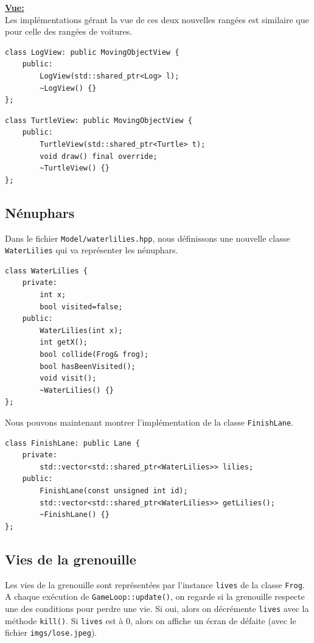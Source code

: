 \documentclass[a4paper, 12pt]{article}
\begin{document}
\underline{\textbf{Vue:}} \\
Les implémentations gérant la vue de ces deux nouvelles rangées est similaire que pour celle 
des rangées de voitures.
\begin{lstlisting}
class LogView: public MovingObjectView {
    public:
        LogView(std::shared_ptr<Log> l);
        ~LogView() {}
};
\end{lstlisting}

\begin{lstlisting}
class TurtleView: public MovingObjectView {
    public:
        TurtleView(std::shared_ptr<Turtle> t);
        void draw() final override;
        ~TurtleView() {}
};
\end{lstlisting}

\subsection{Nénuphars} \label{lilies}

Dans le fichier \texttt{Model/waterlilies.hpp}, 
nous définissons une nouvelle classe \texttt{WaterLilies} qui va représenter les nénuphars. 

\begin{lstlisting}
class WaterLilies {
    private:
        int x;
        bool visited=false;
    public:
        WaterLilies(int x);
        int getX();
        bool collide(Frog& frog);
        bool hasBeenVisited();
        void visit();
        ~WaterLilies() {}
};
\end{lstlisting} \hspace{0.5cm}

Nous pouvons maintenant montrer l'implémentation de la classe \texttt{FinishLane}.

\begin{lstlisting}
class FinishLane: public Lane {
    private:
        std::vector<std::shared_ptr<WaterLilies>> lilies;
    public:
        FinishLane(const unsigned int id);
        std::vector<std::shared_ptr<WaterLilies>> getLilies();
        ~FinishLane() {}
};
\end{lstlisting} \hspace{0.5cm}

\subsection{Vies de la grenouille} \label{lives}

Les vies de la grenouille sont représentées par l'instance \texttt{lives} de la classe 
\texttt{Frog}. 
A chaque exécution de \texttt{GameLoop::update()}, 
on regarde si la grenouille respecte une des conditions pour perdre une vie. 
Si oui, alors on décrémente \texttt{lives} avec la méthode \texttt{kill()}. 
Si \texttt{lives} est à 0, 
alors on affiche un écran de défaite (avec le fichier \texttt{imgs/lose.jpeg}).
\end{document}
